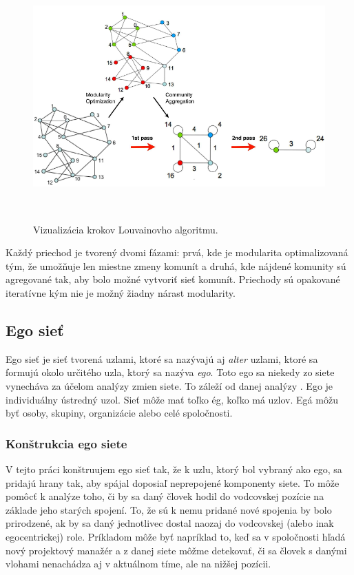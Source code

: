 \documentclass[slovak,master,public,dept460,male,cpdeclaration,oneside]{diploma}
\begin{document}
\begin{figure}[H]
\centering
\includegraphics[width=14.5cm, height=9.5cm]{figures/louvain}
\caption{Vizualizácia krokov Louvainovho algoritmu. }
\end{figure}

Každý priechod je tvorený dvomi fázami: prvá, kde je modularita optimalizovaná tým, že umožňuje len miestne zmeny komunít a druhá, kde nájdené komunity sú agregované tak, aby bolo možné vytvoriť sieť komunít. Priechody sú opakované iteratívne kým nie je možný žiadny nárast modularity.

\subsection{Ego sieť}

Ego sieť je sieť tvorená uzlami, ktoré sa nazývajú aj \textit{alter} uzlami, ktoré sa formujú okolo určitého uzla, ktorý sa nazýva \textit{ego}. Toto ego sa niekedy zo siete vynecháva za účelom analýzy zmien siete. To záleží od danej analýzy \cite{6}. Ego je individuálny ústredný uzol. Sieť môže mať toľko ég, koľko má uzlov. Egá môžu byť osoby, skupiny, organizácie alebo celé spoločnosti.


\subsubsection{Konštrukcia ego siete}
V tejto práci konštruujem ego sieť tak, že k uzlu, ktorý bol vybraný ako ego, sa pridajú hrany tak, aby spájal doposiaľ neprepojené komponenty siete. To môže pomôcť k analýze toho, či by sa daný človek hodil do vodcovskej pozície na základe jeho starých spojení. To, že sú k nemu pridané nové spojenia by bolo prirodzené, ak by sa daný jednotlivec dostal naozaj do vodcovskej (alebo inak egocentrickej) role. Príkladom môže byť napríklad to, keď sa v spoločnosti hľadá nový projektový manažér a z danej siete môžme detekovať, či sa človek s danými vlohami nenachádza aj v aktuálnom tíme, ale na nižšej pozícii.
\end{document}
